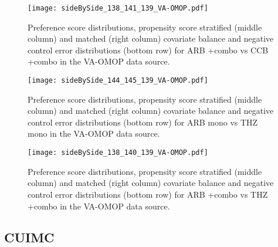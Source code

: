 \documentclass[11pt,]{article}
\begin{document}
\begin{figure}
    \caption{Preference score distributions,
    propensity score stratified (middle column) and matched (right column) covariate balance
    and negative control error distributions (bottom row) for
    ARB +combo vs CCB +combo in the VA-OMOP data source.}
    \centerline{
        \texttt{[image: sideBySide\_138\_141\_139\_VA-OMOP.pdf]}
    }
\end{figure}
\begin{figure}
    \caption{Preference score distributions,
    propensity score stratified (middle column) and matched (right column) covariate balance
    and negative control error distributions (bottom row) for
    ARB mono vs THZ mono in the VA-OMOP data source.}
    \centerline{
        \texttt{[image: sideBySide\_144\_145\_139\_VA-OMOP.pdf]}
    }
\end{figure}
\begin{figure}
    \caption{Preference score distributions,
    propensity score stratified (middle column) and matched (right column) covariate balance
    and negative control error distributions (bottom row) for
    ARB +combo vs THZ +combo in the VA-OMOP data source.}
    \centerline{
        \texttt{[image: sideBySide\_138\_140\_139\_VA-OMOP.pdf]}
    }
\end{figure}

\clearpage

\hypertarget{cuimc-1}{%
\subsection{CUIMC}\label{cuimc-1}}
\end{document}
